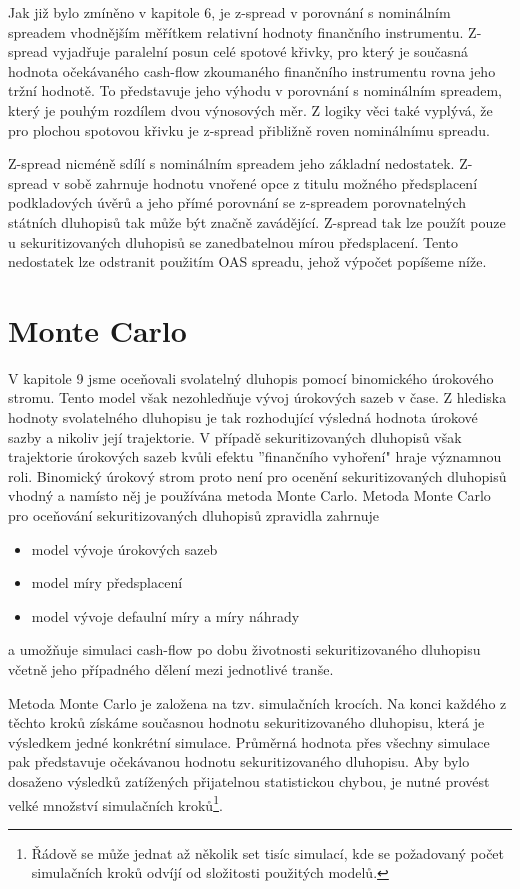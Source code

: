 \documentclass[a4paper]{book}
\begin{document}
Jak již bylo zmíněno v kapitole 6, je z-spread v porovnání s nominálním spreadem vhodnějším měřítkem relativní hodnoty finančního instrumentu. Z-spread vyjadřuje paralelní posun celé spotové křivky, pro který je současná hodnota očekávaného cash-flow zkoumaného finančního instrumentu rovna jeho tržní hodnotě. To představuje jeho výhodu v porovnání s nominálním spreadem, který je pouhým rozdílem dvou výnosových měr. Z logiky věci také vyplývá, že pro plochou spotovou křivku je z-spread přibližně roven nominálnímu spreadu.

Z-spread nicméně sdílí s nominálním spreadem jeho základní nedostatek. Z-spread v sobě zahrnuje hodnotu vnořené opce z titulu možného předsplacení podkladových úvěrů a jeho přímé porovnání se z-spreadem porovnatelných státních dluhopisů tak může být značně zavádějící. Z-spread tak lze použít pouze u sekuritizovaných dluhopisů se zanedbatelnou mírou předsplacení. Tento nedostatek lze odstranit použitím OAS spreadu, jehož výpočet popíšeme níže. 

\section{Monte Carlo}

V kapitole 9 jsme oceňovali svolatelný dluhopis pomocí binomického úrokového stromu. Tento model však nezohledňuje vývoj úrokových sazeb v čase. Z hlediska hodnoty svolatelného dluhopisu je tak rozhodující výsledná hodnota úrokové sazby a nikoliv její trajektorie. V případě sekuritizovaných dluhopisů však trajektorie úrokových sazeb kvůli efektu ''finančního vyhoření" hraje významnou roli. Binomický úrokový strom proto není pro ocenění sekuritizovaných dluhopisů vhodný a namísto něj je používána metoda Monte Carlo. Metoda Monte Carlo pro oceňování sekuritizovaných dluhopisů zpravidla zahrnuje
\begin{itemize}
\item model vývoje úrokových sazeb
\item model míry předsplacení
\item model vývoje defaulní míry a míry náhrady
\end{itemize}
a umožňuje simulaci cash-flow po dobu životnosti sekuritizovaného dluhopisu včetně jeho případného dělení mezi jednotlivé tranše.

Metoda Monte Carlo je založena na tzv. simulačních krocích. Na konci každého z těchto kroků získáme současnou hodnotu sekuritizovaného dluhopisu, která je výsledkem jedné konkrétní simulace. Průměrná hodnota přes všechny simulace pak představuje očekávanou hodnotu sekuritizovaného dluhopisu. Aby bylo dosaženo výsledků zatížených přijatelnou statistickou chybou, je nutné provést velké množství simulačních kroků\footnote{Řádově se může jednat až několik set tisíc simulací, kde se požadovaný počet simulačních kroků odvíjí od složitosti použitých modelů.}.
\end{document}
